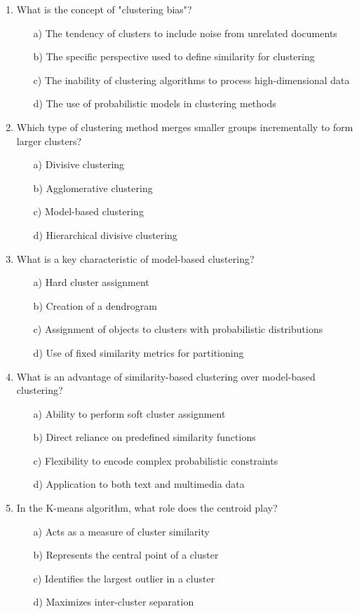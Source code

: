 \documentclass[8pt]{extarticle}
\begin{document}
\begin{multicols}{2}
\begin{enumerate}
\item What is the concept of "clustering bias"?
\begin{itemize}
\item[a)] The tendency of clusters to include noise from unrelated documents
\item[b)] The specific perspective used to define similarity for clustering
\item[c)] The inability of clustering algorithms to process high-dimensional data
\item[d)] The use of probabilistic models in clustering methods
\end{itemize}

\item Which type of clustering method merges smaller groups incrementally to form larger clusters?
\begin{itemize}
\item[a)] Divisive clustering
\item[b)] Agglomerative clustering
\item[c)] Model-based clustering
\item[d)] Hierarchical divisive clustering
\end{itemize}

\item What is a key characteristic of model-based clustering?
\begin{itemize}
\item[a)] Hard cluster assignment
\item[b)] Creation of a dendrogram
\item[c)] Assignment of objects to clusters with probabilistic distributions
\item[d)] Use of fixed similarity metrics for partitioning
\end{itemize}

\item What is an advantage of similarity-based clustering over model-based clustering?
\begin{itemize}
\item[a)] Ability to perform soft cluster assignment
\item[b)] Direct reliance on predefined similarity functions
\item[c)] Flexibility to encode complex probabilistic constraints
\item[d)] Application to both text and multimedia data
\end{itemize}

\item In the K-means algorithm, what role does the centroid play?
\begin{itemize}
\item[a)] Acts as a measure of cluster similarity
\item[b)] Represents the central point of a cluster
\item[c)] Identifies the largest outlier in a cluster
\item[d)] Maximizes inter-cluster separation
\end{itemize}


\end{enumerate}
\end{multicols}
\end{document}
